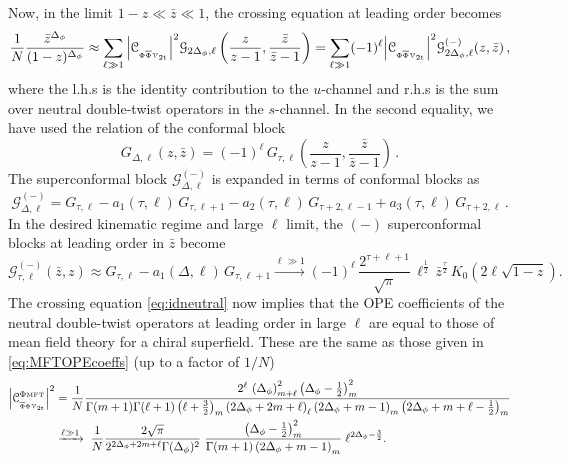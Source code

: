 \documentclass[11pt]{article}
\newcommand{\zb}{\bar{z}}
\newcommand{\Phib}{\overline{\Phi}}
\newcommand{\cope}[1]{\mathcal{C}_{_{#1}}}
\newcommand{\mft}{\text{\tiny MFT}}
\begin{document}
Now, in the limit $1-z \ll \zb \ll 1$, the crossing equation at leading order becomes
%
\begin{equation}\label{eq:idneutral}
\frac{1}{N}\frac{\zb^{\Delta_{\phi}}}{(1-z)^{\Delta_{\phi}} } \approx  \sum_{\ell \gg 1} 
   \abs{\cope{\Phi\Phib\mathcal{V}_{\mathrm{2t}}}}^{2}\mathcal{G}_{2\Delta_{\phi},\ell}\left(\frac{z}{z-1},\frac{\zb}{\zb-1}\right)=
  \sum_{\ell \gg 1} 
   (-1)^{\ell}\abs{\cope{\Phi\Phib\mathcal{V}_{\mathrm{2t}}}}^{2}\mathcal{G}_{2\Delta_{\phi},\ell}^{(-)}(z,\zb)\,,
\end{equation}
%
where the l.h.s is the identity contribution to the $u$-channel and r.h.s is the sum over neutral double-twist operators in the $s$-channel. In the second equality, we have used the relation of the conformal block
%
\begin{equation}
G_{\Delta,\ell} (z,\zb)
  = (-1)^\ell \,G_{\tau,\ell}\left(\frac{z}{z-1},\frac{\zb}{\zb-1}\right)\,.
\end{equation}
%
The superconformal block $\mathcal{G}_{\Delta,\ell}^{(-)}$ is expanded in terms of conformal blocks as
%
\begin{equation}\label{eq:sconfdecomp-}
\mathcal{G}_{\Delta,\ell}^{(-)} 
  = G_{\tau,\ell}-a_{1}(\tau,\ell)\, G_{\tau,\ell+1}-
  a_{2}(\tau,\ell)\, G_{\tau+2,\ell-1}+a_{3}(\tau,\ell)\, G_{\tau+2,\ell}\,.
\end{equation}
%
In the desired kinematic regime and large $\ell$ limit, the $(-)$ superconformal blocks at leading order in $\zb$ become
% 
\begin{equation}\label{eqn:sconfblockdiff_limit}
\mathcal{G}_{\tau,\ell}^{(-)}(\zb,z) 
\approx G_{\tau,\ell}-a_{1}(\Delta,\ell) \, G_{\tau,\ell+1}
   \xrightarrow{\ell \gg 1}  (-1)^{\ell}\, \frac{2^{\tau+\ell+1}}{\sqrt{\pi}}\, \ell^{\frac{1}{2}} \, \zb^{\frac{\tau}{2}} \,
   K_{0}\left(2\ell\sqrt{1-z}\right).
\end{equation}
%
The crossing equation \eqref{eq:idneutral} now implies that the OPE coefficients of the neutral double-twist operators at leading order in large $\ell$ are equal to those of mean field theory for a chiral superfield. 
These are the same as those given in \eqref{eq:MFTOPEcoeffs} (up to a factor of $1/N$)  
%
\begin{equation}\label{eq:MFTOPEcoeffs_chiral}
\begin{split}
\abs{\cope{\Phib\Phi\mathcal{V}_{\mathrm{2t}}}^{\Phi\mft}}^{2} 
&= 
\frac{1}{N}\frac{2^{\ell}\,\left(\Delta_{\phi}\right)_{m+\ell}^{2} \left(\Delta_{\phi}-\frac{1}{2}\right)_{m}^{2}}{\Gamma(m+1)\Gamma(\ell+1) \left( \ell+\frac{3}{2}\right)_{m}   \left(2\Delta_{\phi}+2m+\ell\right)_{\ell} \left(2\Delta_{\phi}+m-1\right)_{m} \left(2\Delta_{\phi}+m+\ell-\frac{1}{2}\right)_{m}} \\
&\xrightarrow{\ell \gg 1} \;
\frac{1}{N}\frac{2\sqrt{\pi}}{2^{2\Delta_{\phi}+2m+\ell}\Gamma(\Delta_{\phi})^{2}} \; 
  \frac{\left(\Delta_{\phi}-\frac{1}{2}\right)_{m}^{2}}{\Gamma(m+1) \left(2\Delta_{\phi}+m-1\right)_{m}} \; 
  \ell^{2\Delta_{\phi}-\frac{3}{2}}.
\end{split}
\end{equation}
\end{document}
